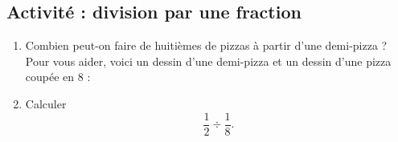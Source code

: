 
\subsection*{Activité : division par une fraction}

\begin{enumerate}
    \item
        Combien peut-on faire de huitièmes de pizzas à partir d'une demi-pizza ? Pour vous aider, voici un dessin d'une demi-pizza et un dessin d'une pizza coupée en \( 8\) :
        \begin{center}
           
           
        \end{center}
    \item
        Calculer
        \begin{equation}
            \dfrac{ 1 }{ 2 }\div\frac{1}{ 8 }.
        \end{equation}
\end{enumerate}
